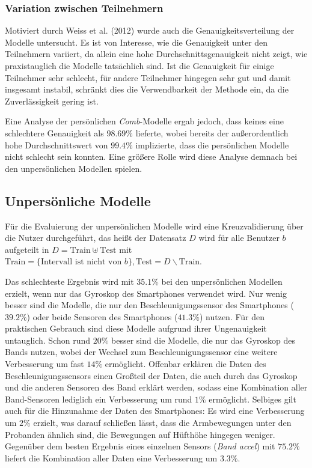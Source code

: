 \subsubsection{Variation zwischen Teilnehmern}
Motiviert durch Weiss et al. (2012) \cite{Weiss2012} wurde auch die Genauigkeitsverteilung der Modelle untersucht. Es ist von Interesse, wie die Genauigkeit unter den Teilnehmern variiert, da allein eine hohe Durchschnittsgenauigkeit nicht zeigt, wie praxistauglich die Modelle tatsächlich sind. Ist die Genauigkeit für einige Teilnehmer sehr schlecht, für andere Teilnehmer hingegen sehr gut und damit insgesamt instabil, schränkt dies die Verwendbarkeit der Methode ein, da die Zuverlässigkeit gering ist.

Eine Analyse der persönlichen \textit{Comb}-Modelle ergab jedoch, dass keines eine schlechtere Genauigkeit als $98.69 \%$ lieferte, wobei bereits der außerordentlich hohe Durchschnittswert von $99.4 \%$ implizierte, dass die persönlichen Modelle nicht schlecht sein konnten. Eine größere Rolle wird diese Analyse demnach bei den unpersönlichen Modellen spielen.

\subsection{Unpersönliche Modelle}
\label{subsec:eval-impersonal-models}
Für die Evaluierung der unpersönlichen Modelle wird eine Kreuzvalidierung über die Nutzer durchgeführt, das heißt der Datensatz $D$ wird für alle Benutzer $b$ aufgeteilt in $D = \text{Train} \uplus \text{Test}$ mit $\text{Train} = \{\text{Intervall ist nicht von } b\}, \text{Test} = D \backslash \text{Train}$.

Das schlechteste Ergebnis wird mit $35.1 \%$ bei den unpersönlichen Modellen erzielt, wenn nur das Gyroskop des Smartphones verwendet wird. Nur wenig besser sind die Modelle, die nur den Beschleunigungssensor des Smartphones ($39.2 \%$) oder beide Sensoren des Smartphones ($41.3 \%$) nutzen. Für den praktischen Gebrauch sind diese Modelle aufgrund ihrer Ungenauigkeit untauglich. Schon rund $20 \%$ besser sind die Modelle, die nur das Gyroskop des Bands nutzen, wobei der Wechsel zum Beschleunigungssensor eine weitere Verbesserung um fast $14 \%$ ermöglicht. Offenbar erklären die Daten des Beschleunigungssensors einen Großteil der Daten, die auch durch das Gyroskop und die anderen Sensoren des Band erklärt werden, sodass eine Kombination aller Band-Sensoren lediglich ein Verbesserung um rund $1 \%$ ermöglicht. Selbiges gilt auch für die Hinzunahme der Daten des Smartphones: Es wird eine Verbesserung um $2 \%$ erzielt, was darauf schließen lässt, dass die Armbewegungen unter den Probanden ähnlich sind, die Bewegungen auf Hüfthöhe hingegen weniger. Gegenüber dem besten Ergebnis eines einzelnen Sensors (\textit{Band accel}) mit $75.2 \%$ liefert die Kombination aller Daten eine Verbesserung um $3.3 \%$.

